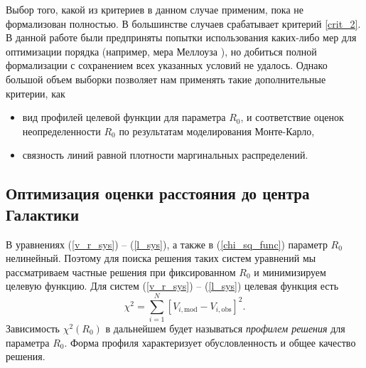 \documentclass{matmex-diploma-custom}
\begin{document}
Выбор того, какой из критериев в данном случае применим, пока не формализован полностью. В большинстве случаев срабатывает критерий \ref{crit_2}. В данной работе были предприняты попытки использования каких-либо мер для оптимизации порядка (например, мера Меллоуза \cite{Valeev}), но добиться полной формализации с сохранением всех указанных условий не удалось. Однако большой объем выборки позволяет нам применять такие дополнительные критерии, как 
\begin{itemize}
        \item вид профилей целевой функции для параметра $R_0$, и соответствие оценок неопределенности $R_0$ по результатам моделирования Монте-Карло,
        \item связность линий равной плотности маргинальных распределений.
\end{itemize}

\subsection{Оптимизация оценки расстояния до центра Галактики}
В уравнениях (\ref{v_r_sys}) -- (\ref{l_sys}), а также в (\ref{chi_sq_func}) параметр $R_0$ нелинейный. Поэтому для поиска решения таких систем уравнений мы рассматриваем частные решения при фиксированном $R_0$ и минимизируем целевую функцию. Для систем (\ref{v_r_sys}) -- (\ref{l_sys}) целевая функция есть
\begin{equation}
        \chi^2 = \sum_{i=1}^{N} \left [ V_{i, \mathrm{mod}} - V_{i, \mathrm{obs}} \right ]^2.
\end{equation}
Зависимость $\chi^2(R_0)$ в дальнейшем будет называться \textit{профилем решения} для параметра $R_0$. Форма профиля характеризует обусловленность и общее качество решения.
\end{document}
